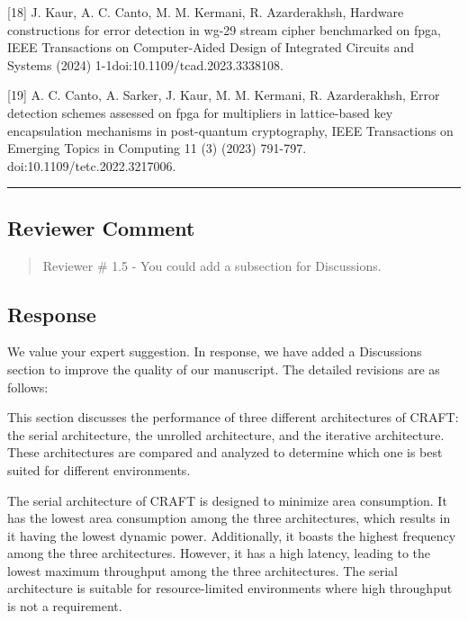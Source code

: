 [18] J. Kaur, A. C. Canto, M. M. Kermani, R. Azarderakhsh, Hardware constructions for error detection in wg-29 stream cipher benchmarked on fpga, IEEE Transactions on Computer-Aided Design of Integrated Circuits and Systems (2024) 1-1doi:10.1109/tcad.2023.3338108.

[19] A. C. Canto, A. Sarker, J. Kaur, M. M. Kermani, R. Azarderakhsh, Error detection schemes assessed on fpga for multipliers in lattice-based key encapsulation mechanisms in post-quantum cryptography, IEEE Transactions on Emerging Topics in Computing 11 (3) (2023) 791-797. doi:10.1109/tetc.2022.3217006.


\color{black}

\noindent\rule{\linewidth}{2.0pt}

\subsection{Reviewer Comment}
\begin{mdframed}
	\begin{quote}
		Reviewer \# 1.5 - You could add a subsection for Discussions.
	\end{quote}
\end{mdframed}

\subsection{Response}

We value your expert suggestion. In response, we have added a Discussions section to improve the quality of our manuscript. The detailed revisions are as follows:

\color{blue}

This section discusses the performance of three different architectures of CRAFT: the serial architecture, the unrolled architecture, and the iterative architecture. These architectures are compared and analyzed to determine which one is best suited for different environments.

The serial architecture of CRAFT is designed to minimize area consumption. It has the lowest area consumption among the three architectures, which results in it having the lowest dynamic power. Additionally, it boasts the highest frequency among the three architectures. However, it has a high latency, leading to the lowest maximum throughput among the three architectures. The serial architecture is suitable for resource-limited environments where high throughput is not a requirement.

